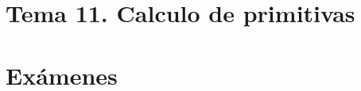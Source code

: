 \documentclass[12pt]{report} %
\begin{document}
\part{Tema 11. Calculo de primitivas}




\part{Exámenes}













\end{document}
